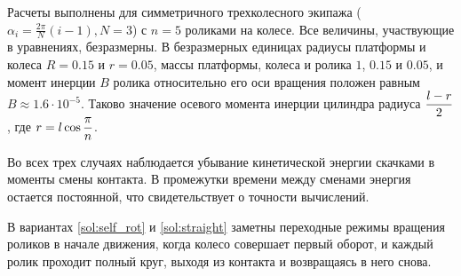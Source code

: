 Расчеты выполнены для симметричного трехколесного экипажа ($\alpha_i = \frac{2\pi}{N}(i - 1), N = 3$) с $n = 5$ роликами на колесе. Все величины, участвующие в уравнениях, безразмерны. В безразмерных единицах радиусы платформы и колеса $R = 0.15$ и $r = 0.05$, массы платформы, колеса и ролика $1$, $0.15$ и $0.05$, и момент инерции $B$ ролика относительно его оси вращения положен равным $B \approx 1.6 \cdot 10^{-5}$. Таково значение осевого момента инерции цилиндра радиуса $\displaystyle\frac{\displaystyle l-r}{\displaystyle 2}$, где $r = l\cos\displaystyle\frac{\displaystyle \pi}{\displaystyle n}$.


Во всех трех случаях наблюдается убывание кинетической энергии скачками в моменты смены контакта. В промежутки времени между сменами энергия остается постоянной, что свидетельствует о точности вычислений.

В вариантах \ref{sol:self_rot} и \ref{sol:straight} заметны переходные режимы вращения роликов в начале движения, когда колесо совершает первый оборот, и каждый ролик проходит полный круг, выходя из контакта и возвращаясь в него снова.

